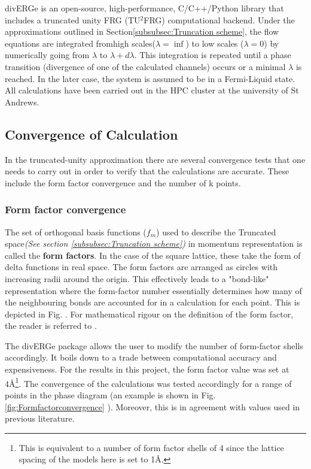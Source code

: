 \documentclass[12pt]{article}
\begin{document}
divERGe is an open-source, high-performance, C/C++/Python library that includes a truncated unity FRG (TU$^2$FRG) computational backend\cite{profe2024diverge}. 
Under the approximations outlined in Section\ref{subsubsec:Truncation scheme}, the flow equations
are integrated fromhigh scales($\lambda = \inf$) to low scales ($\lambda = 0$) by numerically going from $\lambda$ to $\lambda + d\lambda$.
This integration is repeated until a phase transition (divergence of one of the calculated channels) occurs or a minimal $\lambda$ is reached. 
In the later case, the system is assumed to be in a Fermi-Liquid state. 
All calculations have been carried out in the HPC cluster at the university of St Andrews. 


 

\subsection{Convergence of Calculation}
\label{subsec:convergence}
In the truncated-unity approximation there are several convergence tests that one needs to carry out in order to verify
that the calculations are accurate. These include the form factor convergence and the number of k points.

\subsubsection{Form factor convergence}

The set of orthogonal basis functions ($f_m$) used to describe the Truncated space\textit{(See section \ref{subsubsec:Truncation scheme})}
in momentum representation is called the \textbf{form factors}. In the case of the square lattice, 
these take the form of delta functions in real space. The form factors are arranged as circles with increasing radii around the origin. This effectively leads to a "bond-like" representation where the form-factor number
essentially determines how many of the neighbouring bonds are accounted for in a calculation for each point. This is depicted in Fig. . For mathematical rigour on the definition of the form factor, the reader is referred to \cite{lichtenstein2018functional}. \par

\medskip


\noindent The divERGe package allows the user to modify the number of form-factor shells accordingly. It boils down to a trade 
between computational accuracy and expensiveness. 
For the results in this project, the form factor value was set at 4\AA\footnote{This is equivalent to a number of form factor shells of 4 since the lattice spacing of the models here is set to 1\AA.}. The convergence of 
the calculations was tested accordingly for a range of points in the phase diagram (an example is shown in Fig.\ref{fig:Formfactorconvergence} ). Moreover, this is in agreement with values used in previous literature\cite{lichtenstein2018functional}. 
\end{document}
